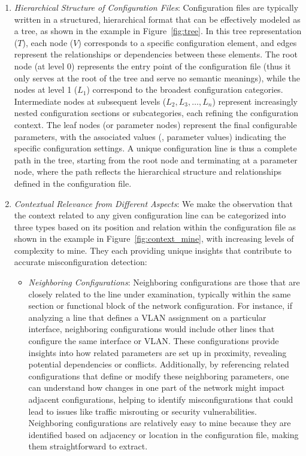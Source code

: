 \begin{enumerate}
    \item \textit{Hierarchical Structure of Configuration Files}: Configuration files are typically written in a structured, hierarchical format that can be effectively modeled as a tree, as shown in the example in Figure~\ref{fig:tree}. In this tree representation (\(T\)), each node (\(V\)) corresponds to a specific configuration element, and edges represent the relationships or dependencies between these elements. The root node (at level 0) represents the entry point of the configuration file (thus it only serves at the root of the tree and serve no semantic meanings), while the nodes at level 1 (\( L_1 \)) correspond to the broadest configuration categories. Intermediate nodes at subsequent levels (\( L_2, L_3, \dots, L_n \)) represent increasingly nested configuration sections or subcategories, each refining the configuration context. The leaf nodes (or parameter nodes) represent the final configurable parameters, with the associated values (\ie, parameter values) indicating the specific configuration settings. A unique configuration line is thus a complete path in the tree, starting from the root node and terminating at a parameter node, where the path reflects the hierarchical structure and relationships defined in the configuration file.

    \item \textit{Contextual Relevance from Different Aspects}: We make the observation that the context related to any given configuration line can be categorized into three types based on its position and relation within the configuration file as shown in the example in Figure~\ref{fig:context_mine}, with increasing levels of complexity to mine. They each providing unique insights that contribute to accurate misconfiguration detection: 
    \begin{itemize}
        \item \textit{Neighboring Configurations}: Neighboring configurations are those that are closely related to the line under examination, typically within the same section or functional block of the network configuration. For instance, if analyzing a line that defines a VLAN assignment on a particular interface, neighboring configurations would include other lines that configure the same interface or VLAN. These configurations provide insights into how related parameters are set up in proximity, revealing potential dependencies or conflicts. Additionally, by referencing related configurations that define or modify these neighboring parameters, one can understand how changes in one part of the network might impact adjacent configurations, helping to identify misconfigurations that could lead to issues like traffic misrouting or security vulnerabilities. Neighboring configurations are relatively easy to mine because they are identified based on adjacency or location in the configuration file, making them straightforward to extract.
        

\end{itemize}
\end{enumerate}
